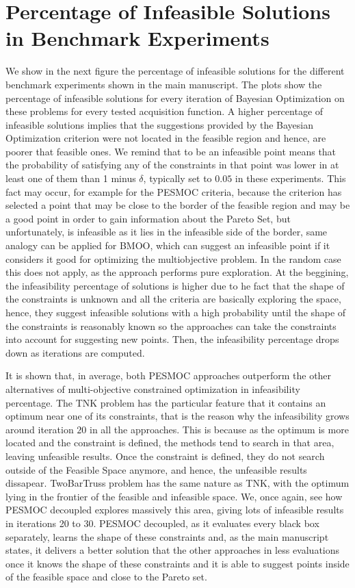 \section{Percentage of Infeasible Solutions in Benchmark Experiments}

We show in the next figure the percentage of infeasible solutions for the different benchmark experiments shown in the main manuscript. The plots show the percentage of infeasible solutions for every iteration of Bayesian Optimization on these problems for every tested acquisition function. A higher percentage of infeasible solutions implies that the suggestions provided by the Bayesian Optimization criterion were not located in the feasible region and hence, are poorer that feasible ones. We remind that to be an infeasible point means that the probability of satisfying any of the constraints in that point was lower in at least one of them than 1 minus $\delta$, typically set to $0.05$ in these experiments. This fact may occur, for example for the PESMOC criteria, because the criterion has selected a point that may be close to the border of the feasible region and may be a good point in order to gain information about the Pareto Set, but unfortunately, is infeasible as it lies in the infeasible side of the border, same analogy can be applied for BMOO, which can suggest an infeasible point if it considers it good for optimizing the multiobjective problem. In the random case this does not apply, as the approach performs pure exploration.  At the beggining, the infeasibility percentage of solutions is higher due to he fact that the shape of the constraints is unknown and all the criteria are basically exploring the space, hence, they suggest infeasible solutions with a high probability until the shape of the constraints is reasonably known so the approaches can take the constraints into account for suggesting new points. Then, the infeasibility percentage drops down as iterations are computed.

It is shown that, in average, both PESMOC approaches outperform the other alternatives of multi-objective constrained optimization in infeasibility percentage. The TNK problem has the particular feature that it contains an optimum near one of its constraints, that is the reason why the infeasibility grows around iteration $20$ in all the approaches. This is because as the optimum is more located and the constraint is defined, the methods tend to search in that area, leaving unfeasible results. Once the constraint is defined, they do not search outside of the Feasible Space anymore, and hence, the unfeasible results dissapear. TwoBarTruss problem has the same nature as TNK, with the optimum lying in the frontier of the feasible and infeasible space. We, once again, see how PESMOC decoupled explores massively this area, giving lots of infeasible results in iterations 20 to 30. PESMOC decoupled, as it evaluates every black box separately, learns the shape of these constraints and, as the main manuscript states, it delivers a better solution that the other approaches in less evaluations once it knows the shape of these constraints and it is able to suggest points inside of the feasible space and close to the Pareto set.

